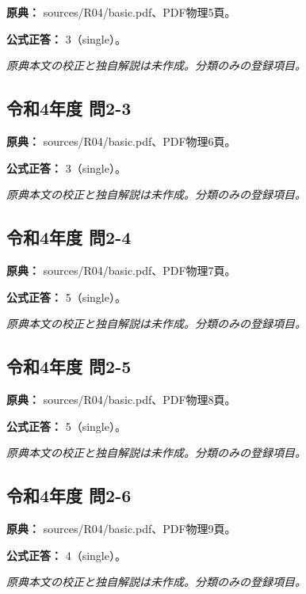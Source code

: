 \noindent\textbf{原典：} sources/R04/basic.pdf、PDF物理5頁。

\textbf{公式正答：} 3（single）。

\par\textit{原典本文の校正と独自解説は未作成。分類のみの登録項目。}

\subsection{令和4年度 問2-3}
\label{q:r04-reg-basic-2-3}

\noindent\textbf{原典：} sources/R04/basic.pdf、PDF物理6頁。

\textbf{公式正答：} 3（single）。

\par\textit{原典本文の校正と独自解説は未作成。分類のみの登録項目。}

\subsection{令和4年度 問2-4}
\label{q:r04-reg-basic-2-4}

\noindent\textbf{原典：} sources/R04/basic.pdf、PDF物理7頁。

\textbf{公式正答：} 5（single）。

\par\textit{原典本文の校正と独自解説は未作成。分類のみの登録項目。}

\subsection{令和4年度 問2-5}
\label{q:r04-reg-basic-2-5}

\noindent\textbf{原典：} sources/R04/basic.pdf、PDF物理8頁。

\textbf{公式正答：} 5（single）。

\par\textit{原典本文の校正と独自解説は未作成。分類のみの登録項目。}

\subsection{令和4年度 問2-6}
\label{q:r04-reg-basic-2-6}

\noindent\textbf{原典：} sources/R04/basic.pdf、PDF物理9頁。

\textbf{公式正答：} 4（single）。

\par\textit{原典本文の校正と独自解説は未作成。分類のみの登録項目。}

